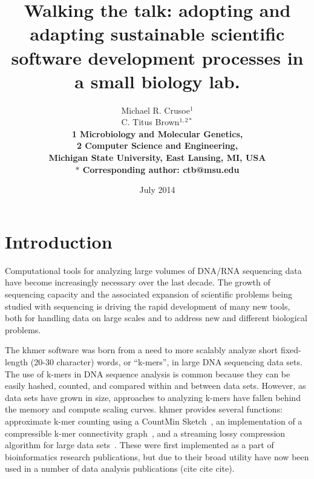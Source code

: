 \documentclass[12pt]{article}
\date{July 2014}
\title{Walking the talk: adopting and adapting sustainable scientific software
  development processes in a small biology lab.}
\author{Michael R. Crusoe$^{1}$\\
C. Titus Brown$^{1,2\ast}$\\
\small \bf{1} Microbiology and Molecular Genetics,\\
\small \bf{2} Computer Science and Engineering,\\
\small Michigan State University, East Lansing, MI, USA\\
\small $\ast$ Corresponding author: ctb@msu.edu}
\begin{document}
\maketitle
\thispagestyle{firststyle}


\setlength{\parindent}{0pt}
\setlength{\parskip}{0.70ex}

\section{Introduction}
Computational tools for analyzing large volumes of DNA/RNA sequencing data
have become increasingly necessary over the last decade.  The growth
of sequencing capacity and the associated expansion of scientific
problems being studied with sequencing is driving the rapid development of
many new tools, both for handling data on large scales and to address
new and different biological problems.

The khmer software was born from a need to more scalably analyze short
fixed-length (20-30 character) words, or ``k-mers'', in large DNA
sequencing data sets. The use of k-mers in DNA sequence analysis is
common because they can be easily hashed, counted, and compared within
and between data sets.  However, as data sets have grown in size,
approaches to analyzing k-mers have fallen behind the memory and
compute scaling curves.  khmer provides several functions: approximate
k-mer counting using a CountMin Sketch~\cite{Zhang2014}, an
implementation of a compressible k-mer connectivity
graph~\cite{Pell2012}, and a streaming lossy compression algorithm for
large data sets~\cite{diginorm}.  These were first implemented as a
part of bioinformatics research publications, but due to their broad
utility have now been used in a number of data analysis publications
(cite cite cite).
\end{document}
